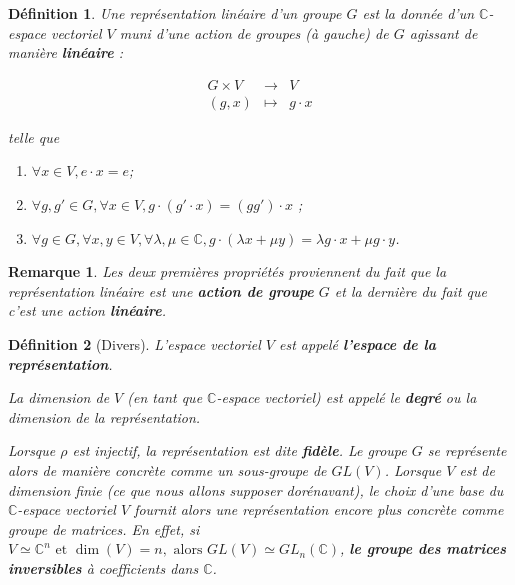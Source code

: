 \documentclass[french]{article}
\newtheorem{definition}{Définition}[section]
\newtheorem*{remark}{Remarque}
\begin{document}
\begin{definition}
  Une représentation linéaire d'un groupe \(G\) est la donnée d'un \(\mathbb{C}\)-espace vectoriel \(V\) muni d'une action de groupes (à gauche) de \(G\) agissant de manière \textbf{linéaire} :

  \[\begin{matrix}
    G \times V & \longrightarrow & V \\
    (g,x) & \longmapsto & g \cdot x
  \end{matrix}\]

  telle que

  \begin{enumerate}
    \item \(\forall x \in V, e \cdot x = e\);
    \item \(\forall g, g' \in G, \forall x \in V, g \cdot (g' \cdot x) = (gg')\cdot x\) ;
    \item \(\forall g \in G, \forall x, y \in V, \forall \lambda, \mu \in \mathbb{C}, g \cdot (\lambda x + \mu y) = \lambda g \cdot x+ \mu g \cdot y \).
  \end{enumerate}
\end{definition}

\begin{remark}
  Les deux premières propriétés proviennent du fait que la représentation linéaire est une \textbf{action de groupe} \(G\) et la dernière du fait que c'est une action \textbf{linéaire}.
\end{remark}


\begin{definition}[Divers]
  L'espace vectoriel \(V\) est appelé \textbf{l'espace de la représentation}.

  La dimension de \(V\) (en tant que \(\mathbb{C}\)-espace vectoriel) est appelé le \textbf{degré} ou la dimension de la représentation.

  Lorsque \(\rho\) est injectif, la représentation est dite \textbf{fidèle}. Le groupe \(G\) se représente alors de manière concrète comme un sous-groupe de \(GL(V)\). Lorsque \(V\) est de dimension finie (ce que nous allons supposer dorénavant), le choix d'une base du \(\mathbb{C}\)-espace vectoriel \(V\) fournit alors une représentation encore plus concrète comme groupe de matrices. En effet, si \(V \simeq \mathbb{C}^{n} \text{ et } \operatorname{dim}(V) = n, \text{ alors } GL(V) \simeq GL_n(\mathbb{C})\), \textbf{le groupe des matrices inversibles} à coefficients dans \(\mathbb{C}\).
\end{definition}
\end{document}
